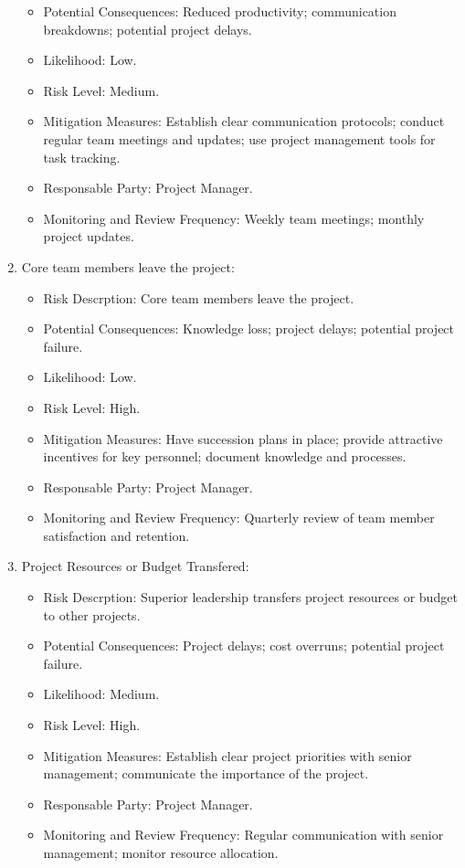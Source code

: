 \documentclass{article}
\begin{document}
\begin{enumerate}
\begin{itemize}
        \item Potential Consequences: Reduced productivity; communication breakdowns; potential project delays.
        \item Likelihood: Low.
        \item Risk Level: Medium.
        \item Mitigation Measures: Establish clear communication protocols; conduct regular team meetings and updates; use project management tools for task tracking.
        \item Responsable Party: Project Manager.
        \item Monitoring and Review Frequency: Weekly team meetings; monthly project updates.
    \end{itemize}
    \item Core team members leave the project:
    \begin{itemize}
        \item Risk Descrption: Core team members leave the project.
        \item Potential Consequences:  Knowledge loss; project delays; potential project failure.
        \item Likelihood: Low.
        \item Risk Level: High.
        \item Mitigation Measures: Have succession plans in place; provide attractive incentives for key personnel; document knowledge and processes.
        \item Responsable Party: Project Manager.
        \item Monitoring and Review Frequency: Quarterly review of team member satisfaction and retention.
    \end{itemize}
    \item Project Resources or Budget Transfered:
    \begin{itemize}
        \item Risk Descrption: Superior leadership transfers project resources or budget to other projects.
        \item Potential Consequences: Project delays; cost overruns; potential project failure.
        \item Likelihood: Medium.
        \item Risk Level: High.
        \item Mitigation Measures: Establish clear project priorities with senior management; communicate the importance of the project.
        \item Responsable Party: Project Manager.
        \item Monitoring and Review Frequency: Regular communication with senior management; monitor resource allocation.
    \end{itemize}
\end{enumerate}
\end{document}

